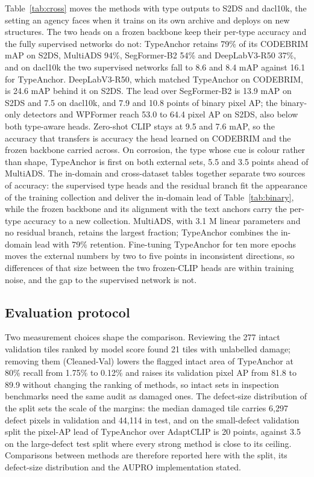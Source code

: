 \documentclass[conference]{IEEEtran}
\newcommand{\ours}{TypeAnchor}
\begin{document}
Table~\ref{tab:cross} moves the methods with type outputs to S2DS and dacl10k, the setting an agency faces when it trains on its own archive and deploys on new structures. The two heads on a frozen backbone keep their per-type accuracy and the fully supervised networks do not: \ours{} retains 79\% of its CODEBRIM mAP on S2DS, MultiADS 94\%, SegFormer-B2 54\% and DeepLabV3-R50 37\%, and on dacl10k the two supervised networks fall to 8.6 and 8.4 mAP against 16.1 for \ours{}. DeepLabV3-R50, which matched \ours{} on CODEBRIM, is 24.6 mAP behind it on S2DS. The lead over SegFormer-B2 is 13.9 mAP on S2DS and 7.5 on dacl10k, and 7.9 and 10.8 points of binary pixel AP; the binary-only detectors and WPFormer reach 53.0 to 64.4 pixel AP on S2DS, also below both type-aware heads. Zero-shot CLIP stays at 9.5 and 7.6 mAP, so the accuracy that transfers is accuracy the head learned on CODEBRIM and the frozen backbone carried across. On corrosion, the type whose cue is colour rather than shape, \ours{} is first on both external sets, 5.5 and 3.5 points ahead of MultiADS. The in-domain and cross-dataset tables together separate two sources of accuracy: the supervised type heads and the residual branch fit the appearance of the training collection and deliver the in-domain lead of Table~\ref{tab:binary}, while the frozen backbone and its alignment with the text anchors carry the per-type accuracy to a new collection. MultiADS, with 3.1 M linear parameters and no residual branch, retains the largest fraction; \ours{} combines the in-domain lead with 79\% retention. Fine-tuning \ours{} for ten more epochs moves the external numbers by two to five points in inconsistent directions, so differences of that size between the two frozen-CLIP heads are within training noise, and the gap to the supervised network is not.

\subsection{Evaluation protocol}
\label{sec:protocol}
Two measurement choices shape the comparison. Reviewing the 277 intact validation tiles ranked by model score found 21 tiles with unlabelled damage; removing them (Cleaned-Val) lowers the flagged intact area of \ours{} at 80\% recall from 1.75\% to 0.12\% and raises its validation pixel AP from 81.8 to 89.9 without changing the ranking of methods, so intact sets in inspection benchmarks need the same audit as damaged ones. The defect-size distribution of the split sets the scale of the margins: the median damaged tile carries 6{,}297 defect pixels in validation and 44{,}114 in test, and on the small-defect validation split the pixel-AP lead of \ours{} over AdaptCLIP is 20 points, against 3.5 on the large-defect test split where every strong method is close to its ceiling. Comparisons between methods are therefore reported here with the split, its defect-size distribution and the AUPRO implementation stated.
\end{document}
